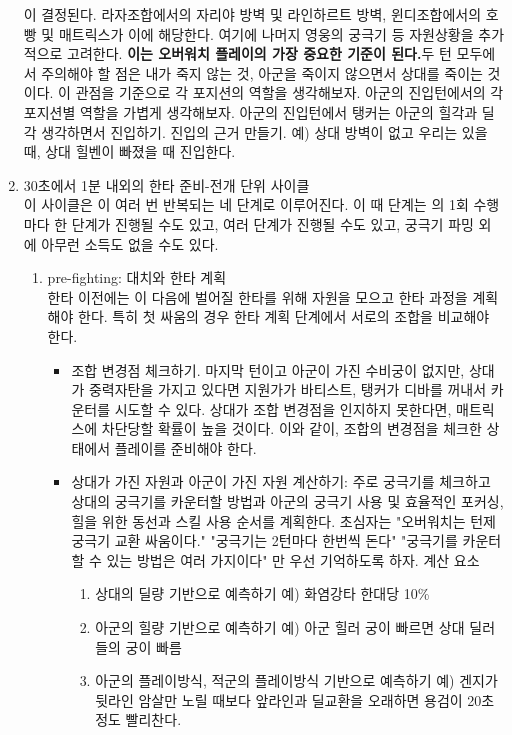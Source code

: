 \begin{enumerate}
    이 결정된다. 라자조합에서의 자리야 방벽 및 라인하르트 방벽, 윈디조합에서의 호빵 및 매트릭스가 이에 해당한다. 여기에 나머지 영웅의 궁극기 등 자원상황을 추가적으로 고려한다. \textbf{이는 오버워치 플레이의 가장 중요한 기준이 된다.}두 턴 모두에서 주의해야 할 점은 내가 죽지 않는 것, 아군을 죽이지 않으면서 상대를 죽이는 것이다. 이 관점을 기준으로 각 포지션의 역할을 생각해보자. 아군의 진입턴에서의 각 포지션별 역할을 가볍게 생각해보자. 아군의 진입턴에서 탱커는 
    아군의 힐각과 딜각 생각하면서 진입하기. 진입의 근거 만들기. 예) 상대 방벽이 없고 우리는 있을 때, 상대 힐벤이 빠졌을 때 진입한다.
    \item 30초에서 1분 내외의 한타 준비-전개 단위 사이클\\
    이 사이클은 이 여러 번 반복되는 네 단계로 이루어진다. 이 때 단계는  의 1회 수행마다 한 단계가 진행될 수도 있고, 여러 단계가 진행될 수도 있고, 궁극기 파밍 외에 아무런 소득도 없을 수도 있다.
    \begin{enumerate}
        \item pre-fighting: 대치와 한타 계획 \\
        한타 이전에는 이 다음에 벌어질 한타를 위해 자원을 모으고 한타 과정을 계획해야 한다. 특히 첫 싸움의 경우 한타 계획 단계에서 서로의 조합을 비교해야 한다.
        \begin{itemize}
            \item 조합 변경점 체크하기. 마지막 턴이고 아군이 가진 수비궁이 없지만, 상대가 중력자탄을 가지고 있다면 지원가가 바티스트, 탱커가 디바를 꺼내서 카운터를 시도할 수 있다. 상대가 조합 변경점을 인지하지 못한다면, 매트릭스에 차단당할 확률이 높을 것이다. 이와 같이, 조합의 변경점을 체크한 상태에서 플레이를 준비해야 한다.
            \item 상대가 가진 자원과 아군이 가진 자원 계산하기: 주로 궁극기를 체크하고 상대의 궁극기를 카운터할 방법과 아군의 궁극기 사용 및 효율적인 포커싱, 힐을 위한 동선과 스킬 사용 순서를 계획한다. 초심자는 "오버워치는 턴제 궁극기 교환 싸움이다."  "궁극기는 2턴마다 한번씩 돈다" "궁극기를 카운터할 수 있는 방법은 여러 가지이다" 만 우선 기억하도록 하자.
             계산 요소
            \begin{enumerate}
                \item 상대의 딜량 기반으로 예측하기 예) 화염강타 한대당 10\%
                \item 아군의 힐량 기반으로 예측하기 예) 아군 힐러 궁이 빠르면 상대 딜러들의 궁이 빠름
                \item 아군의 플레이방식, 적군의 플레이방식 기반으로 예측하기 예) 겐지가 뒷라인 암살만 노릴 때보다 앞라인과 딜교환을 오래하면 용검이 20초정도 빨리찬다. 

\end{enumerate}
\end{itemize}
\end{enumerate}
\end{enumerate}
